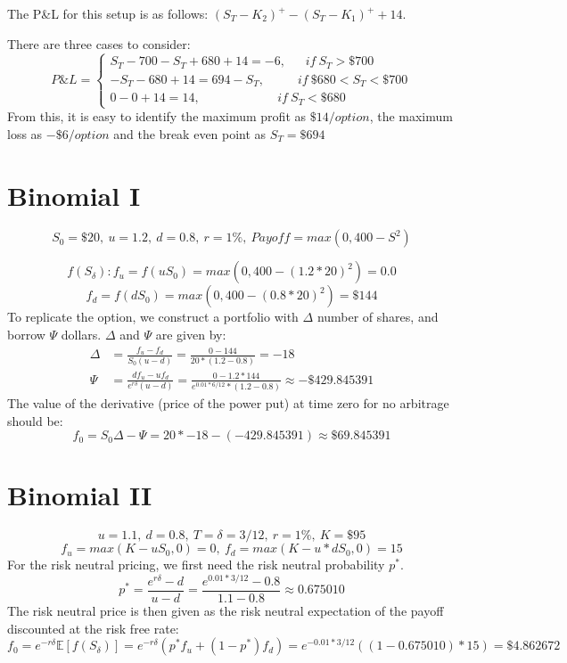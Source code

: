 \documentclass{article}
\begin{document}
The P\&L for this setup is as follows: $(S_T - K_2)^+ - (S_T - K_1)^+ + 14$.

There are three cases to consider:
$$P\&L = \begin{cases} S_T - 700 - S_T + 680 + 14 = -6, \ \ \ \ \ \ \ if \ S_T > \$700 \\ -S_T - 680 + 14 = 694 - S_T, \ \ \ \ \ \ \ \ \ \ \  \ if \ \$680<S_T<\$700 \\ 0 - 0 + 14 = 14, \ \ \ \ \ \ \ \ \ \ \ \ \ \ \ \ \ \ \ \ \ \ \ \ \ \ \ \  if \ S_T < \$680\end{cases}$$
From this, it is easy to identify the maximum profit as $\$14/option$, the maximum loss as $-\$6/option$ and the break even point as $S_T=\$694$

\section{Binomial I}
$$ S_0 = \$20, \ u = 1.2, \ d = 0.8, \ r=1\%, \ Payoff = max(0, 400 - S^2)$$

$$f(S_{\delta}): f_u = f(uS_0) = max(0, 400 - (1.2*20)^2) = 0.0$$
$$f_d = f(dS_0) = max(0, 400 - (0.8*20)^2) = \$144$$
To replicate the option, we construct a portfolio with $\Delta$ number of shares, and borrow $\Psi$ dollars. $\Delta$ and $\Psi$ are given by:
\begin{align*}
	\Delta &= \frac{f_u - f_d}{S_0 (u -d)} = \frac{0 - 144}{20 * (1.2 - 0.8)} = -18 \\
	\Psi &= \frac{df_u - uf_d}{e^{r\delta}(u-d)} = \frac{0 - 1.2 * 144}{e^{0.01 * 6/12} * (1.2-0.8)} \approx -\$429.845391
\end{align*}
The value of the derivative (price of the power put) at time zero for no arbitrage should be:
$$f_0 = S_0\Delta - \Psi = 20*-18 - (-429.845391) \approx \$69.845391 $$

\section{Binomial II}
$$u = 1.1, \ d = 0.8, \ T=\delta=3/12, \ r = 1\%, \ K = \$95$$
$$f_u = max(K - uS_0, 0) = 0, \ f_d = max(K - u * dS_0, 0) = 15$$
For the risk neutral pricing, we first need the risk neutral probability $p^*$.
$$p^* = \frac{e^{r\delta} - d}{u - d} = \frac{e^{0.01 * 3/12}-0.8}{1.1-0.8} \approx 0.675010$$
The risk neutral price is then given as the risk neutral expectation of the payoff discounted at the risk free rate:
$$f_0 = e^{-r\delta}\mathbb{E}[f(S_{\delta})] = e^{-r\delta}\left(p^*f_u + (1-p^*)f_d\right) = e^{-0.01*3/12}\left((1-0.675010)*15\right) = \$4.862672$$
\end{document}
